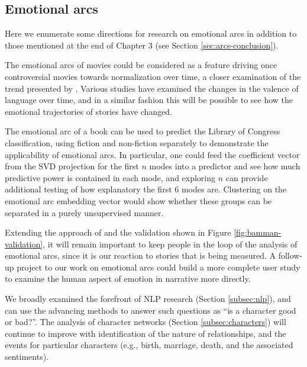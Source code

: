 \subsection{Emotional arcs}

Here we enumerate some directions for research on emotional arcs in addition to those mentioned at the end of Chapter 3 (see Section \ref{sec:arcs-conclusion}).

The emotional arcs of movies could be considered as a feature driving once controversial movies towards normalization over time, a closer examination of the trend presented by \cite{amendola2015evolving}.
Various studies have examined the changes in the valence of language over time, and in a similar fashion this will be possible to see how the emotional trajectories of stories have changed.

The emotional arc of a book can be used to predict the Library of Congress classification, using fiction and non-fiction separately to demonstrate the applicability of emotional arcs.
In particular, one could feed the coefficient vector from the SVD projection for the first $n$ modes into a predictor and see how much predictive power is contained in each mode, and exploring $n$ can provide additional testing of how explanatory the first 6 modes are.
Clustering on the emotional arc embedding vector would show whether these groups can be separated in a purely unsupervised manner.

Extending the approach of \cite{bamman2015validity} and the validation shown in Figure \ref{fig:bamman-validation}, it will remain important to keep people in the loop of the analysis of emotional arcs, since it is our reaction to stories that is being measured.
A follow-up project to our work on emotional arcs could build a more complete user study to examine the human aspect of emotion in narrative more directly.

We broadly examined the forefront of NLP research (Section \ref{subsec:nlp}), and can use the advancing methods to answer such questions as ``is a character good or bad?''.
The analysis of character networks (Section \ref{subsec:characters}) will continue to improve with identification of the nature of relationships, and the events for particular characters (e.g., birth, marriage, death, and the associated sentiments).

